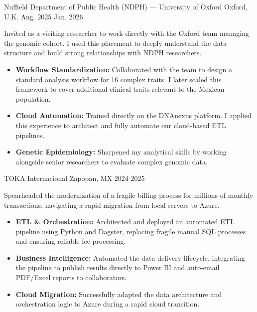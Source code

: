 \documentclass[10pt]{simplecv}
\begin{document}
    {Nuffield Department of Public Health (NDPH) --- University of Oxford}
    {Oxford, U.K.}
    {Aug. 2025}
    {Jan. 2026}
    {
        Invited as a visiting researcher to work directly with the Oxford team managing the genomic cohort. I used this placement to deeply understand the data structure and build strong relationships with NDPH researchers.

        \begin{itemize}[leftmargin=*]
        \setlength{\itemsep}{0cm}
          \item \textbf{Workflow Standardization:} Collaborated with the team to design a standard analysis workflow for 16 complex traits. I later scaled this framework to cover additional clinical traits relevant to the Mexican population.
          \item \textbf{Cloud Automation:} Trained directly on the DNAnexus platform. I applied this experience to architect and fully automate our cloud-based ETL pipelines.
          \item \textbf{Genetic Epidemiology:} Sharpened my analytical skills by working alongside senior researchers to evaluate complex genomic data.
        \end{itemize}
    }

    {TOKA Internacional}
    {Zapopan, MX}
    {2024}
    {2025}
    {
        Spearheaded the modernization of a fragile billing process for millions of monthly transactions, navigating a rapid migration from local servers to Azure.

        \begin{itemize}[leftmargin=*]
        \setlength{\itemsep}{0cm}
            \item \textbf{ETL \& Orchestration:} Architected and deployed an automated ETL pipeline using Python and Dagster, replacing fragile manual SQL processes and ensuring reliable fee processing.
            \item \textbf{Business Intelligence:} Automated the data delivery lifecycle, integrating the pipeline to publish results directly to Power BI and auto-email PDF/Excel reports to collaborators.
            \item \textbf{Cloud Migration:} Successfully adapted the data architecture and orchestration logic to Azure during a rapid cloud transition.
        \end{itemize}
    }
\end{document}
